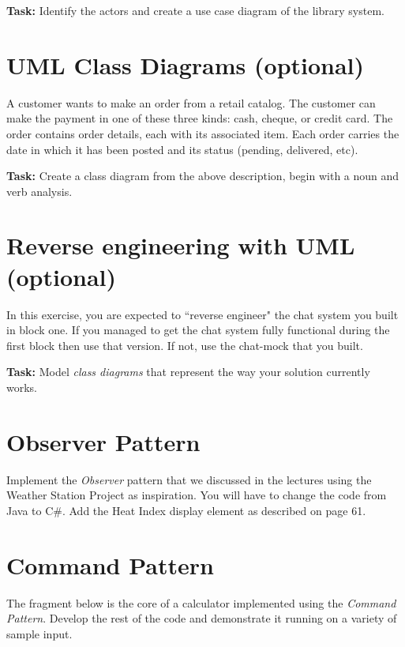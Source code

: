 \documentclass{article}
\begin{document}
\vspace{0.3cm}

  \noindent \textbf{Task:} Identify the actors and create a use case diagram of the library system.




\section{UML Class Diagrams (optional)}

  A customer wants to make an order from a retail catalog. The customer can make the payment in one of these three kinds: cash, cheque, or credit card. The order contains order details, each with its associated item. Each order carries the date in which it has been posted and its status (pending, delivered, etc).

\vspace{0.3cm}

  \noindent \textbf{Task:} Create a class diagram from the above description, begin with a noun and verb analysis.




\section{ Reverse engineering with UML (optional)}
    In this exercise, you are expected to ``reverse engineer" the chat system you built in block one. If you managed to get the chat system fully functional during the first block then use that version. If not, use the chat-mock that you built.

 \vspace{0.3cm}

  \noindent   \textbf{Task:} Model \emph{class diagrams} that represent the way your solution currently works.









\pagebreak
\section{Observer Pattern}
    Implement the \emph{Observer} pattern that we discussed in the lectures using the 
    Weather Station Project as inspiration. You will have to change the code from Java to C\#. 
    Add the Heat Index display element as described on page 61.


\section{Command Pattern}
  The fragment below is the core of a calculator implemented using the 
  \emph{Command Pattern}. Develop the rest of the code and demonstrate it running on a variety
  of sample input.
 
\end{document}
